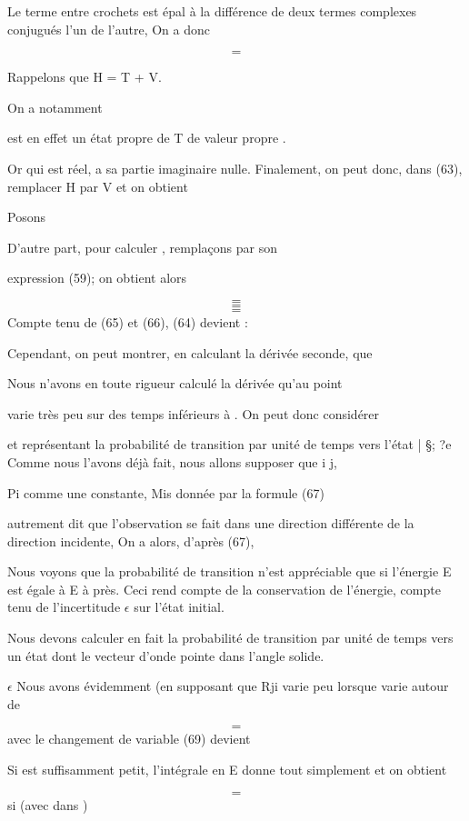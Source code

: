 Le terme entre crochets est épal à la différence de deux termes complexes
conjugués l'un de l'autre, On a donc

\[
\tag{63}=
\]

Rappelons que H = T + V.

On a notamment

 est en effet un état propre de T de valeur propre .

Or  qui est réel, a sa partie imaginaire nulle.
Finalement, on peut donc, dans (63), remplacer H par V et on obtient

Posons

D'autre part, pour calculer , remplaçons  par son

expression (59); on obtient alors


\[
\tag{66}=
\]
\[
\tag{67}=
\]
\[
\tag{68}=
\]
Compte tenu de (65) et (66), (64) devient :

 Cependant, on peut montrer, en calculant la dérivée seconde, que

Nous n'avons en toute rigueur calculé la dérivée  qu'au point

 varie très peu sur des temps inférieurs à . On peut donc considérer


et représentant la probabilité de transition par unité de temps vers
l'état | \S; ?e
Comme nous l'avons déjà fait, nous allons supposer que i  j,

Pi comme une constante, Mis donnée par la formule (67)

autrement dit que l'observation se fait dans une direction différente de
la direction incidente, On a alors, d'après (67),

Nous voyons que la probabilité de transition n'est appréciable
que si l'énergie E est égale à E à  près. Ceci rend compte de la conservation
de l'énergie, compte tenu de l'incertitude $\epsilon$ sur l'état initial.

Nous devons calculer en fait la probabilité de transition par
unité de temps vers un état dont le vecteur d'onde  pointe
dans l'angle solide.


 $\epsilon$ 
Nous avons évidemment (en supposant que Rji varie peu lorsque
 varie autour de 

\[
\tag{69}=
\]
avec le changement de variable
 (69) devient

Si  est suffisamment petit, l'intégrale en E donne tout simplement 
et on obtient

\[
\tag{70}=
\]
si (avec  dans )

